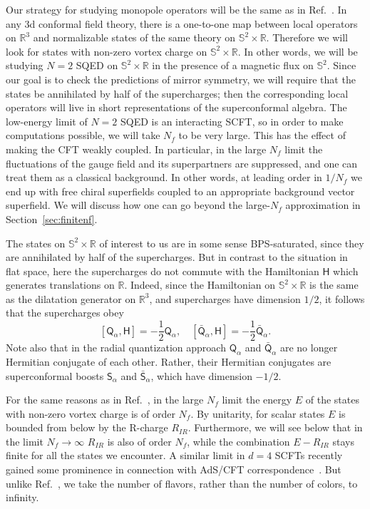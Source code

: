 \documentclass[a4paper,12pt, amsfonts, amssymb]{article}
\newcommand{\RR}{{\mathbb R}}
\renewcommand{\SS}{{\mathbb S}}
\newcommand{\ra}{\rightarrow}
\newcommand{\Q}{{\mathsf Q}}
\renewcommand{\H}{{\mathsf H}}
\renewcommand{\S}{{\mathsf S}}
\begin{document}
Our strategy for studying monopole operators will be the same as in
Ref.~\cite{BKWone}.
In any 3d conformal field theory, there is a one-to-one map between
local operators on $\RR^3$ and normalizable states of the same theory on
$\SS^2\times\RR$. Therefore we will look for states with non-zero vortex
charge on $\SS^2\times\RR$. In other words, we will be studying
$N=2$ SQED on $\SS^2\times\RR$ in the presence of a
magnetic flux on $\SS^2.$ 
Since our goal is to check the predictions of
mirror symmetry, we will require that the states be annihilated by half of
the supercharges; then the corresponding local operators will live in
short representations of the superconformal algebra. The low-energy
limit of $N=2$ SQED is an interacting SCFT, so in order to make computations
possible, we will take $N_f$ to be very large. This has the effect of making
the CFT weakly coupled. In particular, in the large $N_f$ limit the fluctuations
of the gauge field and its superpartners are suppressed, and one can treat
them as a classical background. In other words, at leading order in $1/N_f$
we end up with free chiral superfields coupled to an appropriate background
vector superfield. We will discuss how one can go beyond the large-$N_f$
approximation in Section~\ref{sec:finitenf}.

The states on $\SS^2\times\RR$ of interest to us
are in some sense BPS-saturated, since they are annihilated by half of 
the supercharges. But in contrast to the situation in flat space, here the
supercharges do not commute with the Hamiltonian $\H$ which generates
translations on $\RR$. Indeed, since the Hamiltonian on $\SS^2\times\RR$ is the same as the dilatation generator on $\RR^3$, and supercharges have 
dimension $1/2$, it follows that the supercharges obey
$$
[\Q_\alpha,\H]=-\frac{1}{2} \Q_\alpha, \quad [{\bar\Q}_\alpha,\H]=-\frac{1}{2}{\bar\Q}_\alpha.
$$ 
Note also that in the radial quantization approach $\Q_\alpha$ and
${\bar\Q}_\alpha$
are no longer Hermitian conjugate of each other. Rather, their Hermitian
conjugates are superconformal boosts $\S_\alpha$ and ${\bar\S}_\alpha$, which
have dimension $-1/2$.

For the same reasons as in Ref.~\cite{BKWone},
in the large $N_f$ limit the energy $E$ of the states with non-zero 
vortex charge is of order $N_f$. By unitarity, for scalar states
$E$ is bounded from below by the R-charge $R_{IR}$.
Furthermore, we will see below that in the limit $N_f\ra\infty$ $R_{IR}$
is also of order $N_f$, while the combination $E-R_{IR}$ stays finite for 
all the states we encounter. A similar limit in $d=4$ SCFTs recently gained
some prominence in connection with AdS/CFT correspondence~\cite{BMN}. But
unlike Ref.~\cite{BMN}, we take the number of flavors, rather than the 
number of colors, to infinity.
\end{document}
